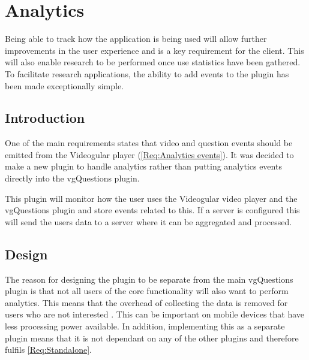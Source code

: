 
\chapter{Analytics} \label{Chapter: Analytics}

\begin{preamble}
	Being able to track how the application is being used will allow further improvements in the user experience and is a key requirement for the client. This will also enable research to be performed once use statistics have been gathered. To facilitate research applications, the ability to add events to the plugin has been made exceptionally simple.
\end{preamble}

\section{Introduction}

One of the main requirements states  that video and question events should be emitted from the Videogular player (\cref{Req:Analytics events}). It was decided to make a new plugin to handle analytics rather than putting analytics events directly into the \gls{vgQuestions} plugin.

This plugin will monitor how the user uses the \gls{Videogular} video player and the \gls{vgQuestions} plugin and store events related to this. If a server is configured this will send the users data to a server where it can be aggregated and processed.

\section{Design}

The reason for designing the plugin to be separate from the main \gls{vgQuestions} plugin is that not all users of the core functionality will also want to perform analytics. This means that the overhead of collecting the data is removed for users who are not interested . This can be important on mobile devices that have less processing power available. In addition, implementing this as a separate plugin means that it is not dependant on any of the other plugins and therefore fulfils \cref{Req:Standalone}.

